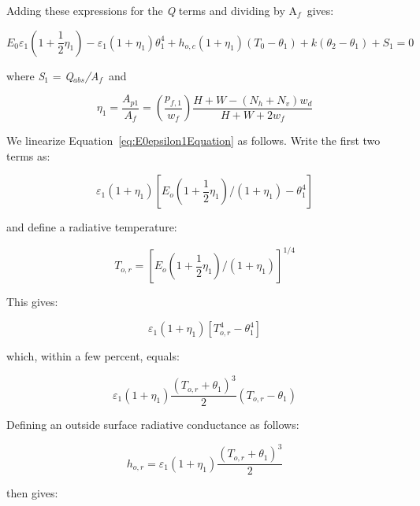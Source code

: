 Adding these expressions for the \emph{Q} terms and dividing by A\(_{f}\)~gives:

\begin{equation}
{E_0}{\varepsilon_1}\left( {1 + \frac{1}{2}{\eta_1}} \right) - {\varepsilon_1}\left( {1 + {\eta_1}} \right)\theta_1^4 + {h_{o,c}}\left( {1 + {\eta_1}} \right)\left( {{T_0} - {\theta_1}} \right) + k\left( {{\theta_2} - {\theta_1}} \right) + {S_1} = 0
\label{eq:E0epsilon1Equation}
\end{equation}

where \emph{S\(_{1}\)} = \emph{Q\(_{abs}\)/A\(_{f}\)}~and

\begin{equation}
{\eta_1} = \frac{{{A_{p1}}}}{{{A_f}}} = \left( {\frac{{{p_{f,1}}}}{{{w_f}}}} \right)\frac{{H + W - ({N_h} + {N_v}){w_d}}}{{H + W + 2{w_f}}}
\end{equation}

We linearize Equation~\ref{eq:E0epsilon1Equation} as follows.  Write the first two terms as:

\begin{equation}
{\varepsilon_1}(1 + {\eta_1})[{E_o}(1 + \frac{1}{2}{\eta_1})/(1 + {\eta_1}) - \theta_1^4]
\end{equation}

and define a radiative temperature:

\begin{equation}
{T_{o,r}} = {[{E_o}(1 + \frac{1}{2}{\eta_1})/(1 + {\eta_1})]^{1/4}}
\end{equation}

This gives:

\begin{equation}
{\varepsilon_1}(1 + {\eta_1})[T_{o,r}^4 - \theta_1^4]
\end{equation}

which, within a few percent, equals:

\begin{equation}
{\varepsilon_1}(1 + {\eta_1})\frac{{{{({T_{o,r}} + {\theta_1})}^3}}}{2}({T_{o,r}} - {\theta_1})
\end{equation}

Defining an outside surface radiative conductance as follows:

\begin{equation}
{h_{o,r}} = {\varepsilon_1}(1 + {\eta_1})\frac{{{{({T_{o,r}} + {\theta_1})}^3}}}{2}
\end{equation}

then gives:


